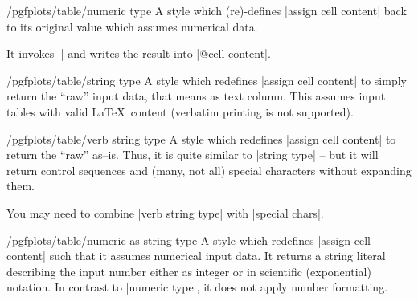 \begin{stylekey}{/pgfplots/table/numeric type}
	A style which (re)-defines |assign cell content| back to its original value which assumes numerical data.

	It invokes |\pgfmathprintnumberto| and writes the result into |@cell content|.
\end{stylekey}

\begin{stylekey}{/pgfplots/table/string type}
	A style which redefines |assign cell content| to simply return the ``raw'' input data, that means as text column. This assumes input tables with valid \LaTeX\ content (verbatim printing is not supported).
\end{stylekey}

\begin{stylekey}{/pgfplots/table/verb string type}
	A style which redefines |assign cell content| to return the ``raw'' as--is. Thus, it is quite similar to |string type| -- but it will return control sequences and (many, not all) special characters without expanding them.

	You may need to combine |verb string type| with |special chars|.
\end{stylekey}

\begin{stylekey}{/pgfplots/table/numeric as string type}
	A style which redefines |assign cell content| such that it assumes numerical input data. It returns a string literal describing the input number either as integer or in scientific (exponential) notation. In contrast to |numeric type|, it does not apply number formatting.
\end{stylekey}

